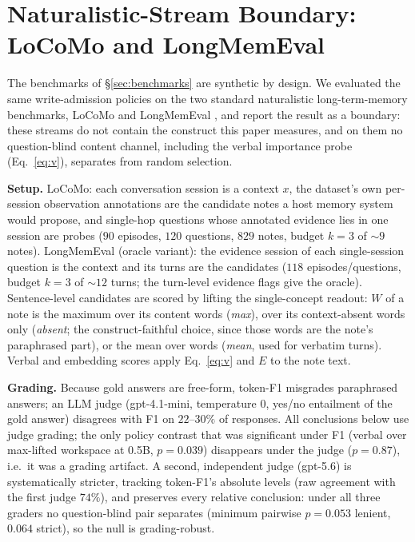 \section{Naturalistic-Stream Boundary: LoCoMo and LongMemEval}
\label{app:locomo}

The benchmarks of \S\ref{sec:benchmarks} are synthetic by design. We
evaluated the same write-admission policies on the two standard naturalistic
long-term-memory benchmarks, LoCoMo \citep{maharana2024locomo} and
LongMemEval \citep{wu2025longmemeval}, and report the result as a boundary:
these streams do not contain the construct this paper measures, and on them no
question-blind content channel, including the verbal importance probe
(Eq.~\ref{eq:v}), separates from random selection.

\textbf{Setup.} LoCoMo: each conversation session is a context $x$, the
dataset's own per-session observation annotations are the candidate notes a
host memory system would propose, and single-hop questions whose annotated
evidence lies in one session are probes ($90$ episodes, $120$ questions,
$829$ notes, budget $k{=}3$ of ${\sim}9$ notes). LongMemEval (oracle
variant): the evidence session of each single-session question is the
context and its turns are the candidates ($118$ episodes/questions,
budget $k{=}3$ of ${\sim}12$ turns; the turn-level evidence flags give the
oracle). Sentence-level candidates are scored by lifting the single-concept
readout: $W$ of a note is the maximum over its content words
(\emph{max}), over its context-absent words only (\emph{absent}; the
construct-faithful choice, since those words are the note's paraphrased
part), or the mean over words (\emph{mean}, used for verbatim turns).
Verbal and embedding scores apply Eq.~\ref{eq:v} and $E$ to the note text.

\textbf{Grading.} Because gold answers are free-form, token-F1 misgrades
paraphrased answers; an LLM judge (gpt-4.1-mini, temperature $0$, yes/no
entailment of the gold answer) disagrees with F1 on $22$--$30\%$ of
responses. All conclusions below use judge grading; the only policy contrast
that was significant under F1 (verbal over max-lifted workspace at 0.5B,
$p{=}0.039$) disappears under the judge ($p{=}0.87$), i.e.\ it was a grading
artifact. A second, independent judge (gpt-5.6) is systematically stricter,
tracking token-F1's absolute levels (raw agreement with the first judge
$74\%$), and preserves every relative conclusion: under all three graders no
question-blind pair separates (minimum pairwise $p{=}0.053$ lenient,
$0.064$ strict), so the null is grading-robust.

